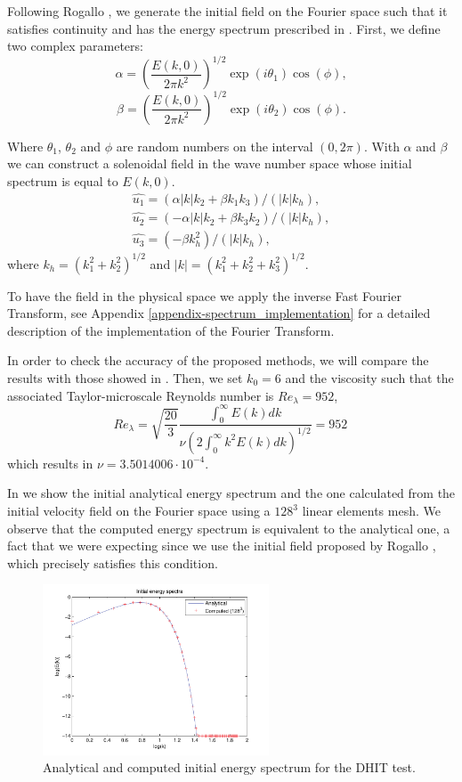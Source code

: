 Following Rogallo \cite{rogallo_numerical_1981}, we generate the initial field on the Fourier space such that it satisfies continuity and has the energy spectrum prescribed in  . First, we define two complex parameters:
$$\alpha=\left(\frac{E(k,0)}{2\pi k^2}\right)^{1/2}\exp(i\theta_1)\cos(\phi),$$
$$\beta=\left(\frac{E(k,0)}{2\pi k^2}\right)^{1/2}\exp(i\theta_2)\cos(\phi).$$

Where $\theta_1$, $\theta_2$ and $\phi$ are random numbers on the interval $(0,2\pi)$. With $\alpha$ and $\beta$ we can construct a solenoidal field in the wave number space whose initial spectrum is equal to $E(k,0)$.
\begin{align}
\label{eq-DHIT_initial_u_fourier}
\hat{u_1}=(\alpha|k|k_2+\beta k_1k_3)/(|k|k_h),\\\nonumber
\hat{u_2}=(-\alpha|k|k_2+\beta k_3k_2)/(|k|k_h),\\\nonumber
\hat{u_3}=(-\beta k_h^2)/(|k|k_h),
\end{align}
where $k_h=\left(k_1^2+k_2^2\right)^{1/2}$ and $|k|=\left(k_1^2+k_2^2+k_3^2\right)^{1/2}$.

To have the field  in the physical space we apply the inverse Fast Fourier Transform, see Appendix \ref{appendix-spectrum_implementation} for a detailed description of the implementation of the Fourier Transform.

In order to check the accuracy of the proposed methods, we will compare the results with those showed in \cite{_selection_????}. Then, we set $k_0=6$ and the viscosity such that the associated Taylor-microscale Reynolds number is $Re_\lambda=952$,
$$Re_\lambda=\sqrt{\frac{20}{3}}\frac{\int_0^\infty E(k)dk}{\nu\left(2\int_0^\infty k^2E(k)dk\right)^{1/2}}=952\,$$
which results in $\nu=3.5014006\cdot 10^{-4}$.

In  we show the initial analytical energy spectrum and the one calculated from the initial velocity field on the Fourier space  using a $128^3$ linear elements mesh. We observe that the computed energy spectrum is equivalent to the analytical one, a fact that we were expecting since we use the initial field proposed by Rogallo \cite{rogallo_numerical_1981}, which precisely satisfies this condition.
\begin{figure}[h!]
	\centering	
	\includegraphics[width=0.6\textwidth]{Figures/Chapter3/DHIT_initial_energy}
	\caption{Analytical and computed initial energy spectrum for the DHIT test.}
	\label{fig-DHIT_initial_spectrum}
\end{figure}

